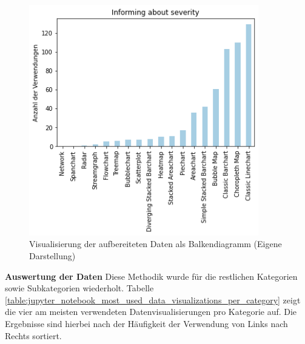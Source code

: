  \begin{figure}[h]
    \includegraphics[width=10cm]{images/plotly_data_visualization_per_category.png}
    \centering
    \caption{Visualisierung der aufbereiteten Daten als Balkendiagramm (Eigene Darstellung)}
    \label{fig:plotly_data_visualization_per_category}
\end{figure}


\clearpage
\noindent
\textbf{Auswertung der Daten}
\newline
\indent
Diese Methodik wurde für die restlichen Kategorien sowie Subkategorien wiederholt. Tabelle \ref{table:jupyter_notebook_most_used_data_visualizations_per_category} zeigt die vier am meisten verwendeten Datenvisualisierungen pro Kategorie auf. Die Ergebnisse sind hierbei nach der Häufigkeit der Verwendung von Links nach Rechts sortiert.

